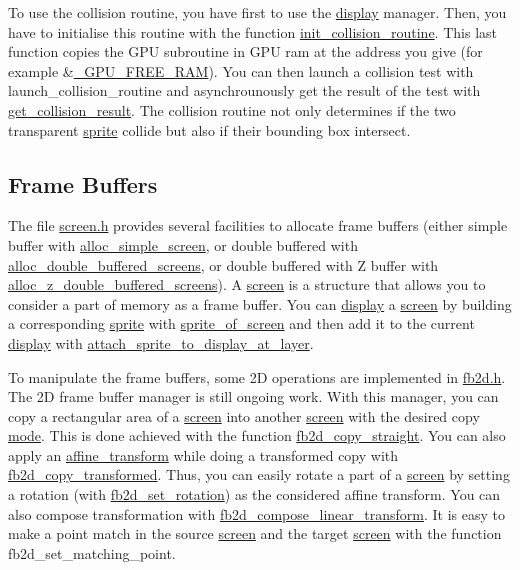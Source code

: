To use the collision routine, you have first to use the \hyperlink{structdisplay}{display} manager. Then, you have to initialise this routine with the function \hyperlink{collision_8h_7f4be2106b6556ad3881c58655d45243}{init\_\-collision\_\-routine}. This last function copies the GPU subroutine in GPU ram at the address you give (for example \&\hyperlink{display_8h_3070edaacfc862ded073b900e4a8d287}{\_\-GPU\_\-FREE\_\-RAM}). You can then launch a collision test with launch\_\-collision\_\-routine and asynchrounously get the result of the test with \hyperlink{collision_8h_a8397216959cbc0822c9183342651b07}{get\_\-collision\_\-result}. The collision routine not only determines if the two transparent \hyperlink{structsprite}{sprite} collide but also if their bounding box intersect.\hypertarget{index_fb2d_subsec}{}\subsection{Frame Buffers}\label{index_fb2d_subsec}
The file \hyperlink{screen_8h}{screen.h} provides several facilities to allocate frame buffers (either simple buffer with \hyperlink{screen_8h_e1d7deddbdd14236abb7bb650be20de9}{alloc\_\-simple\_\-screen}, or double buffered with \hyperlink{screen_8h_e4e147d137d67768a02c3ea36f510aa9}{alloc\_\-double\_\-buffered\_\-screens}, or double buffered with Z buffer with \hyperlink{screen_8h_c9e72af4cef31769aec4d7fb935674a8}{alloc\_\-z\_\-double\_\-buffered\_\-screens}). A \hyperlink{structscreen}{screen} is a structure that allows you to consider a part of memory as a frame buffer. You can \hyperlink{structdisplay}{display} a \hyperlink{structscreen}{screen} by building a corresponding \hyperlink{structsprite}{sprite} with \hyperlink{screen_8h_0c1245ce7e31e9b018ecbc6434b976f5}{sprite\_\-of\_\-screen} and then add it to the current \hyperlink{structdisplay}{display} with \hyperlink{sprite_8h_8439f1930459d5613bc2576ebaddc058}{attach\_\-sprite\_\-to\_\-display\_\-at\_\-layer}.

To manipulate the frame buffers, some 2D operations are implemented in \hyperlink{fb2d_8h}{fb2d.h}. The 2D frame buffer manager is still ongoing work. With this manager, you can copy a rectangular area of a \hyperlink{structscreen}{screen} into another \hyperlink{structscreen}{screen} with the desired copy \hyperlink{fb2d_8h_1a6b6fb557d8d37d59700faf4e4c9167}{mode}. This is done achieved with the function \hyperlink{fb2d_8h_4cc39956d4b967c82458494b078eb882}{fb2d\_\-copy\_\-straight}. You can also apply an \hyperlink{structaffine__transform}{affine\_\-transform} while doing a transformed copy with \hyperlink{fb2d_8h_8b7fa1d86cdbf3905987a81c35fbc589}{fb2d\_\-copy\_\-transformed}. Thus, you can easily rotate a part of a \hyperlink{structscreen}{screen} by setting a rotation (with \hyperlink{fb2d_8h_e87648e4c086e115be29d1808848f87c}{fb2d\_\-set\_\-rotation}) as the considered affine transform. You can also compose transformation with \hyperlink{fb2d_8h_2139ab12aef896735f4cb0ff7079eaa1}{fb2d\_\-compose\_\-linear\_\-transform}. It is easy to make a point match in the source \hyperlink{structscreen}{screen} and the target \hyperlink{structscreen}{screen} with the function fb2d\_\-set\_\-matching\_\-point.

